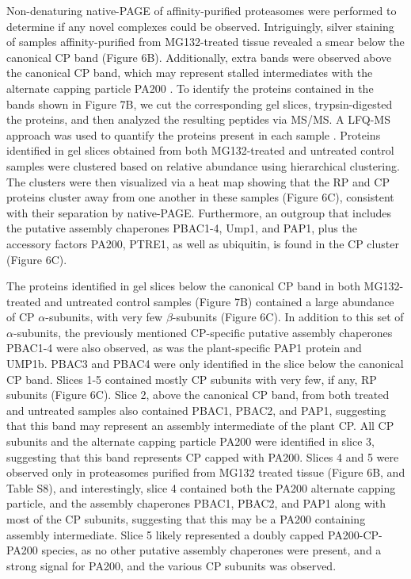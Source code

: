 Non-denaturing native-PAGE of affinity-purified proteasomes were performed to determine if any novel complexes could be observed. Intriguingly, silver staining of samples affinity-purified from MG132-treated tissue revealed a smear below the canonical CP band (Figure 6B). Additionally, extra bands were observed above the canonical CP band, which may represent stalled intermediates with the alternate capping particle PA200 \citep{li07}. To identify the proteins contained in the bands shown in Figure 7B, we cut the corresponding gel slices, trypsin-digested the proteins, and then analyzed the resulting peptides via MS/MS. A LFQ-MS approach was used to quantify the proteins present in each sample \citep{gemperline16}. Proteins identified in gel slices obtained from both MG132-treated and untreated control samples were clustered based on relative abundance using hierarchical clustering. The clusters were then visualized via a heat map showing that the RP and CP proteins cluster away from one another in these samples (Figure 6C), consistent with their separation by native-PAGE. Furthermore, an outgroup that includes the putative assembly chaperones PBAC1-4, Ump1, and PAP1, plus the accessory factors PA200, PTRE1, as well as ubiquitin, is found in the CP cluster (Figure 6C). 

The proteins identified in gel slices below the canonical CP band in both MG132-treated and untreated control samples (Figure 7B) contained a large abundance of CP $\alpha$-subunits, with very few $\beta$-subunits (Figure 6C). In addition to this set of $\alpha$-subunits, the previously mentioned CP-specific putative assembly chaperones PBAC1-4 were also observed, as was the plant-specific PAP1 protein and UMP1b. PBAC3 and PBAC4 were only identified in the slice below the canonical CP band. Slices 1-5 contained mostly CP subunits with very few, if any, RP subunits (Figure 6C). Slice 2, above the canonical CP band, from both treated and untreated samples also contained PBAC1, PBAC2, and PAP1, suggesting that this band may represent an assembly intermediate of the plant CP. All CP subunits and the alternate capping particle PA200 were identified in slice 3, suggesting that this band represents CP capped with PA200. Slices 4 and 5 were observed only in proteasomes purified from MG132 treated tissue (Figure 6B, and Table S8), and interestingly, slice 4 contained both the PA200 alternate capping particle, and the assembly chaperones PBAC1, PBAC2, and PAP1 along with most of the CP subunits, suggesting that this may be a PA200 containing assembly intermediate. Slice 5 likely represented a doubly capped PA200-CP-PA200 species, as no other putative assembly chaperones were present, and a strong signal for PA200, and the various CP subunits was observed. 

